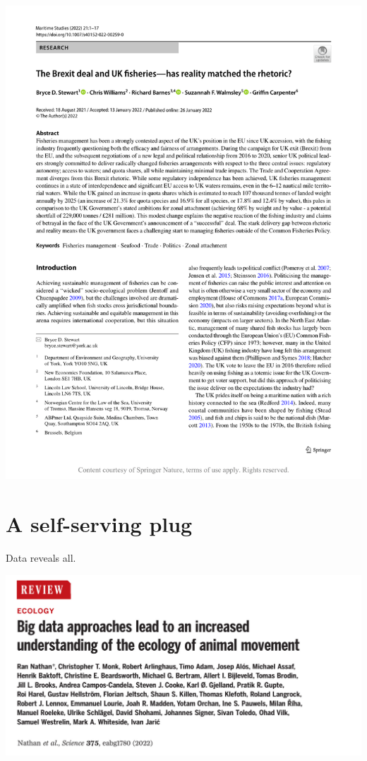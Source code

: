 \documentclass[
]{book}
\begin{document}
\begin{center}\includegraphics[width=1\linewidth]{_images/brexit} \end{center}

\hypertarget{a-self-serving-plug}{%
\chapter{A self-serving plug}\label{a-self-serving-plug}}

Data reveals all.

\begin{center}\includegraphics[width=1\linewidth]{_images/big} \end{center}
\end{document}
